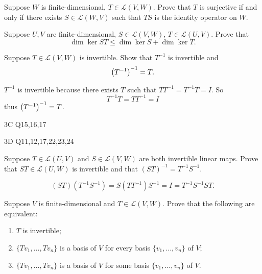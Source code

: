\begin{solution}

\end{solution}

\begin{exercise}
Suppose $W$ is finite-dimensional, $T\in\mathcal{L}(V,W)$. Prove that $T$ is surjective if and only if there exists $S\in\mathcal{L}(W,V)$ such that $TS$ is the identity operator on $W$.
\end{exercise}

\begin{exercise}
Suppose $U,V$ are finite-dimensional, $S\in\mathcal{L}(V,W)$, $T\in\mathcal{L}(U,V)$. Prove that
\[\dim\ker ST\le\dim\ker S+\dim\ker T.\]
\end{exercise}

\begin{solution}

\end{solution}

\begin{exercise}
Suppose $T\in\mathcal{L}(V,W)$ is invertible. Show that $T^{-1}$ is invertible and
\[\left(T^{-1}\right)^{-1}=T.\]
\end{exercise}

\begin{solution}
$T^{-1}$ is invertible because there exists $T$ such that $TT^{-1}=T^{-1}T=I$. So
\[T^{-1}T=TT^{-1}=I\]
thus $\left(T^{-1}\right)^{-1}=T$.
\end{solution}

3C Q15,16,17

3D Q11,12,17,22,23,24

\begin{exercise}
Suppose $T\in\mathcal{L}(U,V)$ and $S\in\mathcal{L}(V,W)$ are both invertible linear maps. Prove that $ST\in\mathcal{L}(U,W)$ is invertible and that $(ST)^{-1}=T^{-1}S^{-1}$.
\end{exercise}

\begin{solution}
\[(ST)(T^{-1}S^{-1})=S(TT^{-1})S^{-1}=I=T^{-1}S^{-1}ST.\]
\end{solution}

\begin{exercise}
Suppose $V$ is finite-dimensional and $T\in\mathcal{L}(V,W)$. Prove that the following are equivalent:
\begin{enumerate}[label=(\roman*)]
\item $T$ is invertible;
\item $\{Tv_1,\dots,Tv_n\}$ is a basis of $V$ for every basis $\{v_1,\dots,v_n\}$ of $V$;
\item $\{Tv_1,\dots,Tv_n\}$ is a basis of $V$ for some basis $\{v_1,\dots,v_n\}$ of $V$.
\end{enumerate}
\end{exercise}

